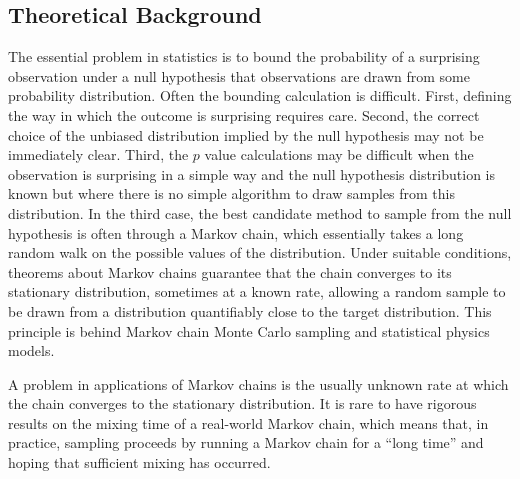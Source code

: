 \documentclass[12pt]{article}
\begin{document}
\subsection*{Theoretical Background}


The essential problem in statistics is to bound the probability of a
surprising observation under a null hypothesis that observations are
drawn from some probability distribution.  Often the bounding
calculation is difficult.  First, defining the way in which the outcome
is surprising requires care.  Second, the correct choice of the unbiased
distribution implied by the null hypothesis may not be immediately
clear.
Third, the \( p \) value calculations may be difficult when
the observation is surprising in a simple way and the null hypothesis
distribution is known but where there is no simple algorithm to draw
samples from this distribution.  In the third case, the best candidate
method to sample from the null hypothesis is often through a Markov
chain, which essentially takes a long random walk on the possible values
of the distribution.  Under suitable conditions, theorems about Markov
chains guarantee that the chain converges to its stationary
distribution, sometimes at a known rate, allowing a random sample to be
drawn from a distribution quantifiably close to the target distribution.
This principle is behind Markov chain Monte Carlo sampling and
statistical physics models.

A problem in applications of Markov chains is the usually unknown rate
at which the chain converges to the stationary distribution.  It is
rare to have rigorous results on the mixing time of a real-world Markov
chain, which means that, in practice, sampling proceeds by running a
Markov chain for a ``long time'' and hoping that sufficient mixing has
occurred.
\end{document}
